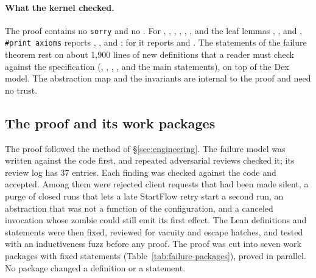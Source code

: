 \paragraph{What the kernel checked.}
The proof contains no \texttt{sorry} and no . For
, ,
, ,
, , and the leaf lemmas
, , and
, \texttt{\#print axioms} reports
, , and ;
for  it reports  and
. The statements of the failure theorem rest on about
1,900 lines of new definitions that a reader must check against the
specification (, ,
, , and the main statements), on top
of the Dex model. The abstraction map and the invariants are internal to
the proof and need no trust.

\subsection{The proof and its work packages}
\label{sec:failure-proof}

The proof followed the method of \S\ref{sec:engineering}. The failure
model was written against the code first, and repeated adversarial
reviews checked it; its review log has 37 entries. Each finding was
checked against the code and accepted. Among them were rejected client
requests that had been made silent, a purge of closed runs that lets a
late StartFlow retry start a second run, an abstraction that was not a
function of the configuration, and a canceled invocation whose zombie
could still emit its first effect. The Lean
definitions and statements were then fixed, reviewed for vacuity and escape
hatches, and tested with an inductiveness fuzz before any proof. The proof
was cut into seven work packages with fixed statements
(Table~\ref{tab:failure-packages}), proved in parallel. No package changed a
definition or a statement.

